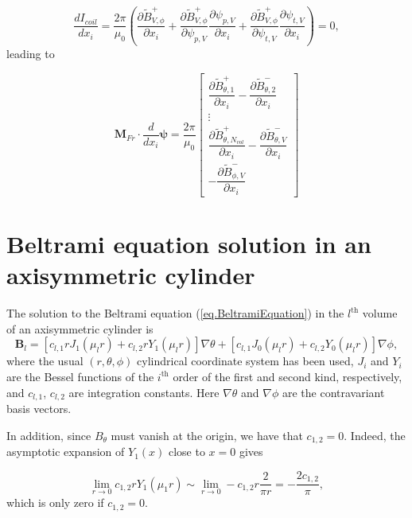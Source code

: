 \begin{equation}
	\frac{dI_{coil}}{dx_i} = \frac{2\pi}{\mu_0}\left( \frac{\partial  \tilde{B}^+_{V,\phi}}{\partial x_i} + \frac{\partial  \tilde{B}^+_{V,\phi}}{\partial \psi_{p,V}}\frac{\partial\psi_{p,V}}{\partial x_i} +  \frac{\partial  \tilde{B}^+_{V,\phi}}{\partial \psi_{t,V}}\frac{\partial \psi_{t,V}}{\partial x_i} \right)   =0,
\end{equation}
leading to

\begin{equation}
	\mathbf{M}_{Fr} \cdot 
	\dfrac{d}{dx_i}\bm{\psi} = \frac{2\pi}{\mu_0} \begin{bmatrix}
		\dfrac{\partial \tilde{B}^+_{\theta,1}}{\partial x_i} - \dfrac{\partial \tilde{B}^-_{\theta,2}}{\partial x_i} \\
		\vdots \\
		\dfrac{\partial \tilde{B}^+_{\theta,N_{vol}} } {\partial x_i} - \dfrac{\partial \tilde{B}^-_{\theta,V}}{\partial x_i} \\
		-\dfrac{\partial\tilde{B}^-_{\phi,V}}{\partial x_i}
	\end{bmatrix}
\end{equation}



\chapter{Beltrami equation solution in an axisymmetric cylinder}\label{appB}

The solution to the Beltrami equation (\ref{eq.BeltramiEquation}) in the $l^{\text{th}}$ volume of an axisymmetric cylinder is
	\begin{equation}
		\mathbf{B}_l = \left[c_{l,1}rJ_1(\mu_l r) + c_{l,2}rY_1(\mu_lr)\right] \nabla\theta + \left[c_{l,1}J_0(\mu_l r) + c_{l,2}Y_0(\mu_lr)\right] \nabla\phi,
\end{equation}
where the usual $(r,\theta,\phi)$ cylindrical coordinate system has been used, $J_i$ and $Y_i$ are the Bessel functions of the $i^\text{th}$ order of the first and second kind, respectively, and $c_{l,1}$, $c_{l,2}$ are integration constants. Here $\nabla\theta$ and $\nabla\phi$ are the contravariant basis vectors.

In addition, since $B_\theta$ must vanish at the origin, we have that $c_{1,2}=0$. Indeed, the asymptotic expansion of $Y_1(x)$ close to $x=0$ gives \citep{abramowitz_handbook_1964}

\begin{equation}
	\lim_{r\rightarrow 0} c_{1,2}rY_1(\mu_1 r) \sim \lim_{r\rightarrow 0} -c_{1,2}r\frac{2}{\pi r} = -\frac{2c_{1,2}}{\pi},
\end{equation}
which is only zero if $c_{1,2}=0$. 

